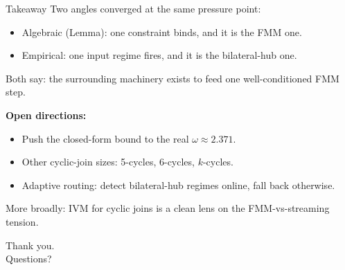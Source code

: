 \documentclass[aspectratio=169,10pt]{beamer}
\begin{document}
\begin{frame}{Takeaway}
  Two angles converged at the same pressure point:
  \begin{itemize}
    \item \alert{Algebraic} (Lemma): one constraint binds, and it is the FMM one.
    \item \alert{Empirical}: one input regime fires, and it is the bilateral-hub one.
  \end{itemize}

  \vspace{0.5em}
  Both say: the surrounding machinery exists \alert{to feed one well-conditioned FMM step}.

  \vspace{0.8em}
  \textbf{Open directions:}
  \begin{itemize}
    \item Push the closed-form bound to the real $\omega \approx 2.371$.
    \item Other cyclic-join sizes: 5-cycles, 6-cycles, $k$-cycles.
    \item Adaptive routing: detect bilateral-hub regimes online, fall back otherwise.
  \end{itemize}

  \vspace{0.5em}
  More broadly: \alert{IVM for cyclic joins} is a clean lens on the FMM-vs-streaming tension.
\end{frame}

\begin{frame}[standout]
  Thank you. \\[0.5em]
  \large Questions?
\end{frame}
\end{document}
